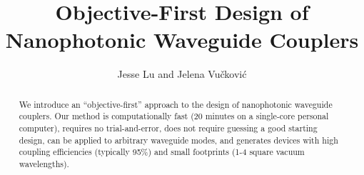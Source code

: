 \documentclass[letterpaper,10pt]{article}
\begin{document}
\title{Objective-First Design of Nanophotonic Waveguide Couplers}
\author{Jesse Lu and Jelena Vu\v{c}kovi\'{c}}
\address{Stanford University, Stanford, California, USA.}

\maketitle
\begin{abstract}
We introduce an ``objective-first'' approach to the design of
    nanophotonic waveguide couplers.
Our method is
    computationally fast (20 minutes on a single-core personal computer), 
    requires no trial-and-error,
    does not require guessing a good starting design,
    can be applied to arbitrary waveguide modes,
    and generates devices with high coupling efficiencies (typically 95\%)
    and small footprints (1-4 square vacuum wavelengths).
\end{abstract}
\end{document}
